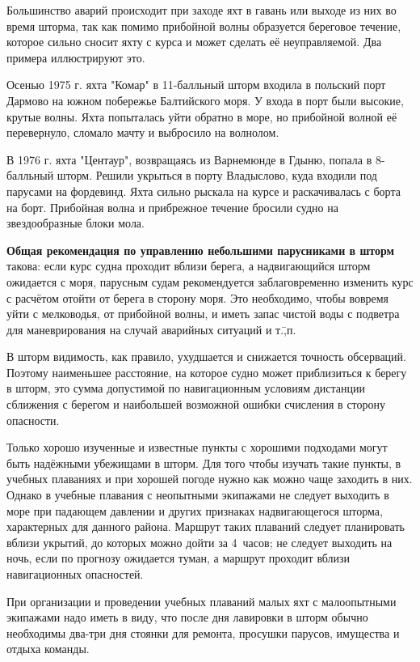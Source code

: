 Большинство аварий происходит при заходе яхт в гавань или выходе из
них во время шторма, так как помимо прибойной волны образуется
береговое течение, которое сильно сносит яхту с курса и может сделать
её неуправляемой. Два примера иллюстрируют это.

{\small Осенью 1975 г. яхта "Комар" в 11-балльный шторм входила в
  польский порт Дармово на южном побережье Балтийского моря. У входа в
  порт были высокие, крутые волны. Яхта попыталась уйти обратно в
  море, но прибойной волной её перевернуло, сломало мачту и выбросило
  на волнолом.

  В 1976 г. яхта "Центаур", возвращаясь из Варнемюнде в Гдыню, попала
  в 8-балльный шторм. Решили укрыться в порту Владыслово, куда входили
  под парусами на фордевинд. Яхта сильно рыскала на курсе и
  раскачивалась с борта на борт. Прибойная волна и прибрежное течение
  бросили судно на звездообразные блоки мола.}

\textbf{Общая рекомендация по управлению небольшими парусниками в шторм}
такова: если курс судна проходит вблизи берега, а надвигающийся шторм
ожидается с моря, парусным судам рекомендуется заблаговременно
изменить курс с расчётом отойти от берега в сторону моря. Это
необходимо, чтобы вовремя уйти с мелководья, от прибойной волны, и
иметь запас чистой воды с подветра для маневрирования на случай
аварийных ситуаций и т.\=,п.

В шторм видимость, как правило, ухудшается и снижается точность
обсерваций. Поэтому наименьшее расстояние, на которое судно может
приблизиться к берегу в шторм, это сумма допустимой по навигационным
условиям дистанции сближения с берегом и наибольшей возможной ошибки
счисления в сторону опасности.

Только хорошо изученные и известные пункты с хорошими подходами могут
быть надёжными убежищами в шторм. Для того чтобы изучать такие пункты,
в учебных плаваниях и при хорошей погоде нужно как можно чаще заходить
в них. Однако в учебные плавания с неопытными экипажами не следует
выходить в море при падающем давлении и других признаках
надвигающегося шторма, характерных для данного района. Маршрут таких
плаваний следует планировать вблизи укрытий, до которых можно дойти за
4~часов; не следует выходить на ночь, если по прогнозу
ожидается туман, а маршрут проходит вблизи навигационных опасностей.

При организации и проведении учебных плаваний малых яхт с малоопытными
экипажами надо иметь в виду, что после дня лавировки в шторм обычно
необходимы два-три дня стоянки для ремонта, просушки парусов,
имущества и отдыха команды.

